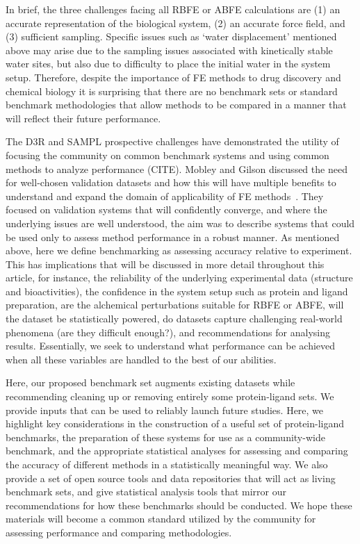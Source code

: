 \documentclass[9pt,bestpractices]{livecoms}
\begin{document}
In brief, the three challenges facing all RBFE or ABFE calculations are (1) an accurate representation of the biological system, (2) an accurate force field, and (3) sufficient sampling. Specific issues such as ‘water displacement’ mentioned above may arise due to the sampling issues associated with kinetically stable water sites, but also due to difficulty to place the initial water in the system setup. Therefore, despite the importance of FE methods to drug discovery and chemical biology it is surprising that there are no benchmark sets or standard benchmark methodologies that allow methods to be compared in a manner that will reflect their future performance. 

The D3R and SAMPL prospective challenges have demonstrated the utility of focusing the community on common benchmark systems and using common methods to analyze performance (CITE). Mobley and Gilson discussed the need for well-chosen validation datasets and how this will have multiple benefits to understand and expand the domain of applicability of FE methods~\cite{mobleyPredictingBindingFree2017}. They focused on validation systems that will confidently converge, and where the underlying issues are well understood, the aim was to describe systems that could be used only to assess method performance in a robust manner. As mentioned above, here we define benchmarking as assessing accuracy relative to experiment. This has implications that will be discussed in more detail throughout this article, for instance, the reliability of the underlying experimental data (structure and bioactivities), the confidence in the system setup such as protein and ligand preparation, are the alchemical perturbations suitable for RBFE or ABFE, will the dataset be statistically powered, do datasets capture challenging real-world phenomena (are they difficult enough?), and recommendations for analysing results. Essentially, we seek to understand what performance can be achieved when all these variables are handled to the best of our abilities.    

Here, our proposed benchmark set augments existing datasets while recommending cleaning up or removing entirely some protein-ligand sets. We provide inputs that can be used to reliably launch future studies. Here, we highlight key considerations in the construction of a useful set of protein-ligand benchmarks, the preparation of these systems for use as a community-wide benchmark, and the appropriate statistical analyses for assessing and comparing the accuracy of different methods in a statistically meaningful way. We also provide a set of open source tools and data repositories that will act as living benchmark sets, and give statistical analysis tools that mirror our  recommendations for how these benchmarks should be conducted. We hope these materials will become a common standard utilized by the community for assessing performance and comparing methodologies.  
\end{document}
